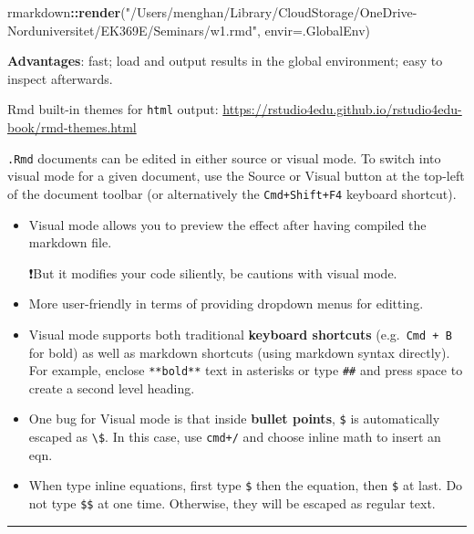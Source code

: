 \documentclass[
  a4paper,
  twoside,
  openright]{book}
\newenvironment{Shaded}{\begin{snugshade}}{\end{snugshade}}
\newcommand{\AttributeTok}[1]{\textcolor[rgb]{0.13,0.29,0.53}{#1}}
\newcommand{\FunctionTok}[1]{\textcolor[rgb]{0.13,0.29,0.53}{\textbf{#1}}}
\newcommand{\NormalTok}[1]{#1}
\newcommand{\SpecialCharTok}[1]{\textcolor[rgb]{0.81,0.36,0.00}{\textbf{#1}}}
\newcommand{\StringTok}[1]{\textcolor[rgb]{0.31,0.60,0.02}{#1}}
\theoremstyle{definition}
\theoremstyle{definition}
\theoremstyle{definition}
\theoremstyle{definition}
\theoremstyle{remark}
\begin{document}
\begin{Shaded}
\begin{Highlighting}[]
\NormalTok{rmarkdown}\SpecialCharTok{::}\FunctionTok{render}\NormalTok{(}\StringTok{"/Users/menghan/Library/CloudStorage/OneDrive{-}Norduniversitet/EK369E/Seminars/w1.rmd"}\NormalTok{, }\AttributeTok{envir=}\NormalTok{.GlobalEnv)}
\end{Highlighting}
\end{Shaded}

\textbf{Advantages}: fast; load and output results in the global environment; easy to inspect afterwards.

Rmd built-in themes for \texttt{html} output: \url{https://rstudio4edu.github.io/rstudio4edu-book/rmd-themes.html}

\texttt{.Rmd} documents can be edited in either source or visual mode. To switch into visual mode for a given document, use the Source or Visual button at the top-left of the document toolbar (or alternatively the \texttt{Cmd+Shift+F4} keyboard shortcut).

\begin{itemize}
\item
  Visual mode allows you to preview the effect after having compiled the markdown file.

  ❗️But it modifies your code siliently, be cautions with visual mode.
\item
  More user-friendly in terms of providing dropdown menus for editting.
\item
  Visual mode supports both traditional \textbf{keyboard shortcuts} (e.g.~\texttt{Cmd\ +\ B} for bold) as well as markdown shortcuts (using markdown syntax directly). For example, enclose \texttt{**bold**} text in asterisks or type \texttt{\#\#} and press space to create a second level heading.
\item
  One bug for Visual mode is that inside \textbf{bullet points}, \texttt{\$} is automatically escaped as \texttt{\textbackslash{}\$}. In this case, use {\texttt{cmd+/}} and choose {inline math} to insert an eqn.
\item
  When type inline equations, first type \texttt{\$} then the equation, then \texttt{\$} at last. Do not type \texttt{\$\$} at one time. Otherwise, they will be escaped as regular text.
\end{itemize}

\begin{center}\rule{0.5\linewidth}{0.5pt}\end{center}
\end{document}
